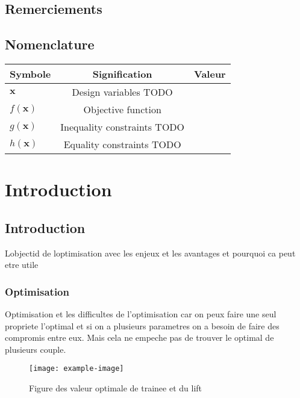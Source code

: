 \documentclass[12pt, a4paper
    ]{book}%
\theoremstyle{definition}
\theoremstyle{remark}
\begin{document}
\section*{Remerciements}{
}

\tableofcontents
\listoffigures
\listoftables
\newpage

\section*{Nomenclature}{
\begin{table}[H]
    \begin{tabular}{l c c} %
        \toprule
        Symbole & Signification & Valeur \\
        \midrule
        $\bm{x}$ & Design variables TODO& \\
        $f(\bm{x})$ & Objective function & \\
        $g(\bm{x})$ & Inequality constraints TODO& \\
        $h(\bm{x})$ & Equality constraints TODO& \\
        \bottomrule
    \end{tabular}
\end{table}
      
}

\newpage



\newpage    
{}

\chapter{Introduction}
\section{Introduction}
Lobjectid de loptimisation avec les enjeux et les avantages et pourquoi ca peut etre utile
\subsection{Optimisation}
Optimisation et les difficultes de l'optimisation car on peux faire une seul propriete l'optimal et si on a plusieurs parametres on a besoin de faire des compromis entre eux. Mais cela ne empeche pas de trouver le optimal de plusieurs couple. 
\begin{figure}[H]
    \centering
    \texttt{[image: example-image]}
    \caption{Figure des valeur optimale de trainee et du lift}
\end{figure}
\end{document}
